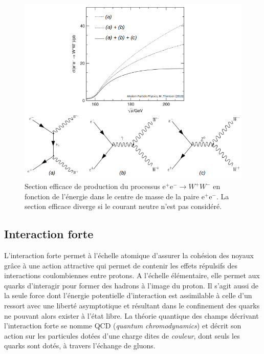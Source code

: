         \begin{figure}
        \centering
            \includegraphics[scale=0.45]{Chapitre2/Images/eescatt.png} 
            \caption{Section efficace de production du processus e$^+$e$^-\rightarrow W^+W^-$ en fonction de l'énergie dans le centre de masse de la paire e$^+$e$^-$. La section efficace diverge si le courant neutre n'est pas considéré.}
        \label{eescat}
        \end{figure}
    
        \subsection{Interaction forte}
        \label{QCD}
        
        L'interaction forte permet à l'échelle atomique d'assurer la cohésion des noyaux grâce à une action attractive qui permet de contenir les effets répulsifs des interactions coulombiennes entre protons. A l'échelle élémentaire, elle permet aux quarks d'interagir pour former des hadrons à l'image du proton. Il s'agit aussi de la seule force dont l'énergie potentielle d'interaction est assimilable à celle d'un ressort avec une liberté asymptotique et résultant dans le confinement des quarks ne pouvant alors exister à l'état libre. La théorie quantique des champs décrivant l'interaction forte se nomme QCD (\textit{quantum chromodynamics}) et décrit son action sur les particules dotées d'une charge dites de \textit{couleur}, dont seuls les quarks sont dotés, à travers l'échange de gluons. \\

